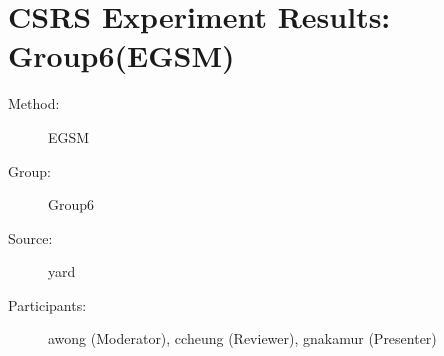 \chapter {CSRS Experiment Results: Group6(EGSM)}	  
\small

\begin{description}
\item [Method:] EGSM
\item [Group:] Group6
\item [Source:] yard
\item [Participants:] awong (Moderator), ccheung (Reviewer), gnakamur (Presenter)
\end{description}
